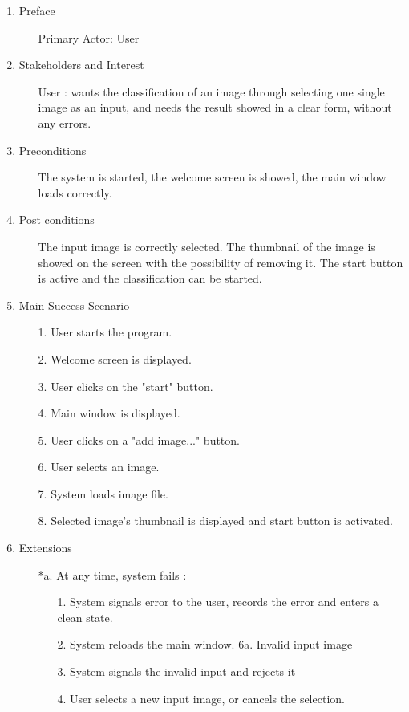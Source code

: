 \documentclass[parskip=full]{scrartcl}
\begin{document}
\begin{enumerate}
	\item Preface
	\begin{itemize} [nosep]
		\item[] Primary Actor: User
	\end{itemize}
	\item Stakeholders and Interest
	\begin{itemize} [nosep]
		\item[] User : wants the classification of an image through selecting one single image as an input, and needs the result showed in a clear form, without any errors.
	\end{itemize}
	\item Preconditions
	\begin{itemize} [nosep]
		\item[] The system is started, the welcome screen is showed, the main window loads correctly.
	\end{itemize}
	\item Post conditions
	\begin{itemize} [nosep]
		\item[] The input image is correctly selected. The thumbnail of the image is showed on the screen with the possibility of removing it. The start button is active and the classification can be started.
	\end{itemize}
	\item Main Success Scenario
	\begin{itemize} [nosep]
		\item[1.] User starts the program.
		\item[2.] Welcome screen is displayed.
		\item[3.] User clicks on the "start" button.
		\item[4.] Main window is displayed.
		\item[5.] User clicks on a "add image..." button.
		\item[6.] User selects an image.
		\item[7.] System loads image file.
		\item[8.] Selected image's thumbnail is displayed and start button is activated.
	\end{itemize}
	\item Extensions
	\begin{itemize} [nosep]
		\item[*a.] At any time, system fails :
		\begin{itemize} [nosep]
			\item[1.] System signals error to the user, records the error and enters a clean state.
			\item[2.] System reloads the main window. 6a. Invalid input image
			\item[3.] System signals the invalid input and rejects it
			\item[4.] User selects a new input image, or cancels the selection.
		\end{itemize}
	\end{itemize}
\end{enumerate}
\end{document}
